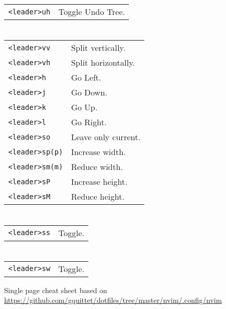 \begin{multicols}{3}
	\section{}
	\begin{tabular}{@{}ll@{}}
		\verb!<leader>uh! & Toggle Undo Tree. \\
	\end{tabular}

	\section{}
	\begin{tabular}{@{}ll@{}}
		\verb!<leader>vv!    & Split vertically.   \\
		\verb!<leader>vh!    & Split horizontally. \\
		\verb!<leader>h!     & Go Left.            \\
		\verb!<leader>j!     & Go Down.            \\
		\verb!<leader>k!     & Go Up.              \\
		\verb!<leader>l!     & Go Right.           \\
		\verb!<leader>so!    & Leave only current. \\
		\verb!<leader>sp(p)! & Increase width.     \\
		\verb!<leader>sm(m)! & Reduce width.       \\
		\verb!<leader>sP!    & Increase height.    \\
		\verb!<leader>sM!    & Reduce height.      \\
	\end{tabular}

	\section{}
	\begin{tabular}{@{}ll@{}}
		\verb!<leader>ss! & Toggle. \\
	\end{tabular}

	\section{}
	\begin{tabular}{@{}ll@{}}
		\verb!<leader>sw! & Toggle. \\
	\end{tabular}

	Single page cheat sheet based on \url{https://github.com/gquittet/dotfiles/tree/master/nvim/.config/nvim}

\end{multicols}

